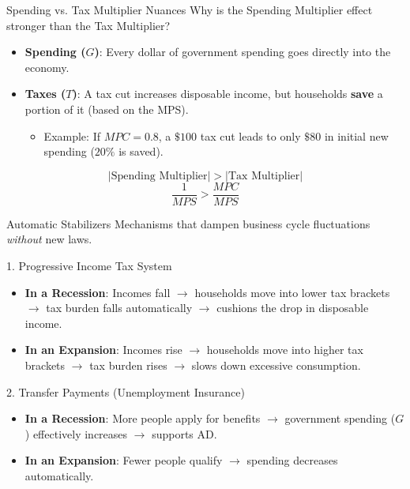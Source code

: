\documentclass{beamer}
\begin{document}
\begin{frame}{Spending vs. Tax Multiplier Nuances}
    Why is the Spending Multiplier effect stronger than the Tax Multiplier?
    \vspace{0.3cm}
    \begin{itemize}
        \item \textbf{Spending ($G$)}: Every dollar of government spending goes directly into the economy.
        \item \textbf{Taxes ($T$)}: A tax cut increases disposable income, but households \textbf{save} a portion of it (based on the MPS).
        \begin{itemize}
            \item Example: If $MPC = 0.8$, a $\$100$ tax cut leads to only $\$80$ in initial new spending ($20\%$ is saved).
        \end{itemize}
    \end{itemize}
    \vspace{0.3cm}
    \[ |\text{Spending Multiplier}| > |\text{Tax Multiplier}| \]
    \[ \frac{1}{MPS} > \frac{MPC}{MPS} \]
\end{frame}

\begin{frame}{Automatic Stabilizers}
    Mechanisms that dampen business cycle fluctuations \textit{without} new laws.
    
    \begin{block}{1. Progressive Income Tax System}
        \begin{itemize}
            \item \textbf{In a Recession}: Incomes fall $\rightarrow$ households move into lower tax brackets $\rightarrow$ tax burden falls automatically $\rightarrow$ cushions the drop in disposable income.
            \item \textbf{In an Expansion}: Incomes rise $\rightarrow$ households move into higher tax brackets $\rightarrow$ tax burden rises $\rightarrow$ slows down excessive consumption.
        \end{itemize}
    \end{block}

    \begin{block}{2. Transfer Payments (Unemployment Insurance)}
        \begin{itemize}
            \item \textbf{In a Recession}: More people apply for benefits $\rightarrow$ government spending ($G$) effectively increases $\rightarrow$ supports AD.
            \item \textbf{In an Expansion}: Fewer people qualify $\rightarrow$ spending decreases automatically.
        \end{itemize}
    \end{block}
\end{frame}
\end{document}
